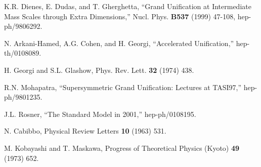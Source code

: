 \documentclass[a4paper,12pt,oneside]{article}
\begin{document}
\begin{thebibliography}{99}
K.R. Dienes, E. Dudas, and T. Gherghetta, ``Grand Unification at 
Intermediate Mass Scales through Extra Dimensions,'' Nucl. Phys. 
\textbf{B537} (1999) 47-108, hep-ph/9806292.

N. Arkani-Hamed, A.G. Cohen, and H. Georgi, ``Accelerated
Unification,'' hep-th/0108089.

H. Georgi and S.L. Glashow, Phys. Rev. Lett. \textbf{32} (1974) 438.

R.N. Mohapatra, ``Supersymmetric Grand Unification: Lectures at TASI97,'' hep-ph/9801235.

J.L. Rosner, ``The Standard Model in 2001,'' hep-ph/0108195.

N. Cabibbo, Physical Review Letters \textbf{10} (1963) 531.

M. Kobayashi and T. Maskawa, Progress of Theoretical Physics (Kyoto) \textbf{49} (1973) 652.

\end{thebibliography}
\end{document}
